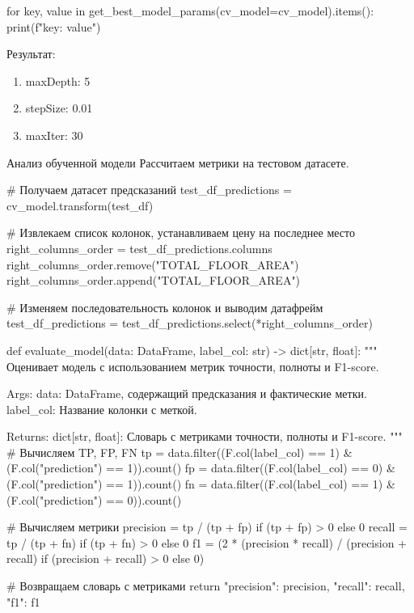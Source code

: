 \begin{code}
for key, value in get_best_model_params(cv_model=cv_model).items():
    print(f"{key}: {value}")
\end{code}

Результат:
\begin{enumerate}
\item maxDepth: 5
\item stepSize: 0.01
\item maxIter: 30
\end{enumerate}

\p Анализ обученной модели
\p Рассчитаем метрики на тестовом датасете.

\begin{code}
# Получаем датасет предсказаний
test_df_predictions = cv_model.transform(test_df)

# Извлекаем список колонок, устанавливаем цену на последнее место
right_columns_order = test_df_predictions.columns
right_columns_order.remove("TOTAL_FLOOR_AREA")
right_columns_order.append("TOTAL_FLOOR_AREA")

# Изменяем последовательность колонок и выводим датафрейм
test_df_predictions = test_df_predictions.select(*right_columns_order)
\end{code}

\begin{code}
def evaluate_model(data: DataFrame, 
                   label_col: str) -> dict[str, float]:
    """
    Оценивает модель с использованием метрик точности, полноты и F1-score.

    Args:
        data: DataFrame, содержащий предсказания и фактические метки.
        label_col: Название колонки с меткой.

    Returns:
        dict[str, float]: Словарь с метриками точности, полноты и F1-score.
    """
    # Вычисляем TP, FP, FN
    tp = data.filter((F.col(label_col) == 1) &
                     (F.col("prediction") == 1)).count()
    fp = data.filter((F.col(label_col) == 0) &
                     (F.col("prediction") == 1)).count()
    fn = data.filter((F.col(label_col) == 1) &
                     (F.col("prediction") == 0)).count()

    # Вычисляем метрики
    precision = tp / (tp + fp) if (tp + fp) > 0 else 0
    recall = tp / (tp + fn) if (tp + fn) > 0 else 0
    f1 = (2 * (precision * recall) / (precision + recall)
        if (precision + recall) > 0 else 0)

    # Возвращаем словарь с метриками
    return {
        "precision": precision,
        "recall": recall,
        "f1": f1
    }
\end{code}


